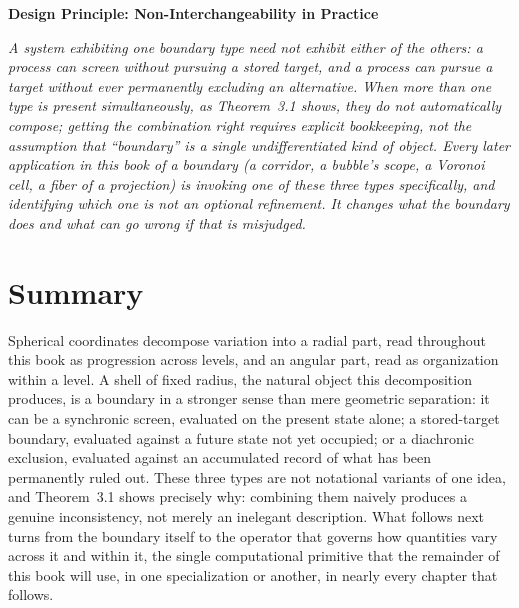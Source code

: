 \documentclass[11pt,fleqn]{book}
\numberwithin{equation}{chapter}
\newenvironment{principle}[1]
  {\begin{principleEnv}
   \noindent\textbf{Design Principle: #1}\par\smallskip\itshape}
  {\end{principleEnv}}
\theoremstyle{plain}
\theoremstyle{definition}
\theoremstyle{remark}
\providecommand{\enquote}[1]{``#1''}
\begin{document}
\begin{principle}{Non-Interchangeability in Practice}
A system exhibiting one boundary type need not exhibit either of the others: a process can screen without pursuing a stored target, and a process can pursue a target without ever permanently excluding an alternative. When more than one type is present simultaneously, as Theorem~3.1 shows, they do not automatically compose; getting the combination right requires explicit bookkeeping, not the assumption that \enquote{boundary} is a single undifferentiated kind of object. Every later application in this book of a boundary (a corridor, a bubble's scope, a Voronoi cell, a fiber of a projection) is invoking one of these three types specifically, and identifying which one is not an optional refinement. It changes what the boundary does and what can go wrong if that is misjudged.
\end{principle}

\section{Summary}

Spherical coordinates decompose variation into a radial part, read throughout this book as progression across levels, and an angular part, read as organization within a level. A shell of fixed radius, the natural object this decomposition produces, is a boundary in a stronger sense than mere geometric separation: it can be a synchronic screen, evaluated on the present state alone; a stored-target boundary, evaluated against a future state not yet occupied; or a diachronic exclusion, evaluated against an accumulated record of what has been permanently ruled out. These three types are not notational variants of one idea, and Theorem~3.1 shows precisely why: combining them naively produces a genuine inconsistency, not merely an inelegant description. What follows next turns from the boundary itself to the operator that governs how quantities vary across it and within it, the single computational primitive that the remainder of this book will use, in one specialization or another, in nearly every chapter that follows.


\end{document}
